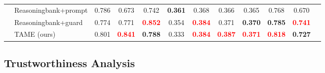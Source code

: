 \documentclass{article}
\theoremstyle{plain}
\theoremstyle{definition}
\theoremstyle{remark}
\begin{document}
\begin{table}[t]
{\begin{tabular}{llcccccccccc}
& Reasoningbank+prompt  & 0.786 & 0.673 & 0.742 & \textbf{0.361} & 0.368 & 0.366 & 0.365 & 0.768 & 0.670 \\
& Reasoningbank+guard & 0.774 & 0.771 & \textcolor{red}{\textbf{0.852}} & 0.354 & \textcolor{red}{\textbf{0.384}} & 0.371 & \textbf{0.370} & \textbf{0.785} & \textcolor{red}{\textbf{0.741}} \\
\rowcolor{cyan!10}
& TAME (ours) & 0.801 & \textcolor{red}{\textbf{0.841}} & \textbf{0.788} & 0.333 & \textcolor{red}{\textbf{0.384}} & \textcolor{red}{\textbf{0.387}} & \textcolor{red}{\textbf{0.371}} & \textcolor{red}{\textbf{0.818}} & \textbf{0.727} \\
\bottomrule
\end{tabular}
}
\label{tab:llm_benchmark_without_memory}
\end{table}

\subsection{Trustworthiness Analysis}
\label{sec:trustworthiness_analysis}

\end{document}
